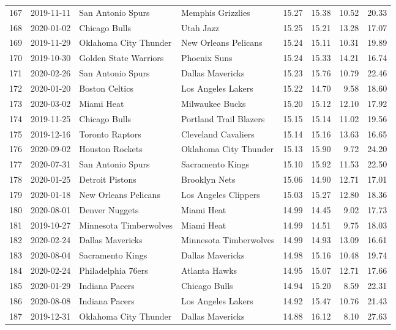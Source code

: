\documentclass[
  11pt,
]{article}
\theoremstyle{nonumberplain}
\begin{document}
\begin{longtable}{rl|llr|rrr}
167 & 2019-11-11 & San Antonio Spurs & Memphis Grizzlies & 15.27 & 15.38 & 10.52 & 20.33\\
168 & 2020-01-02 & Chicago Bulls & Utah Jazz & 15.25 & 15.21 & 13.28 & 17.07\\
169 & 2019-11-29 & Oklahoma City Thunder & New Orleans Pelicans & 15.24 & 15.11 & 10.31 & 19.89\\
170 & 2019-10-30 & Golden State Warriors & Phoenix Suns & 15.24 & 15.33 & 14.21 & 16.74\\
171 & 2020-02-26 & San Antonio Spurs & Dallas Mavericks & 15.23 & 15.76 & 10.79 & 22.46\\
172 & 2020-01-20 & Boston Celtics & Los Angeles Lakers & 15.22 & 14.70 & 9.58 & 18.60\\
173 & 2020-03-02 & Miami Heat & Milwaukee Bucks & 15.20 & 15.12 & 12.10 & 17.92\\
174 & 2019-11-25 & Chicago Bulls & Portland Trail Blazers & 15.15 & 15.14 & 11.02 & 19.56\\
175 & 2019-12-16 & Toronto Raptors & Cleveland Cavaliers & 15.14 & 15.16 & 13.63 & 16.65\\
176 & 2020-09-02 & Houston Rockets & Oklahoma City Thunder & 15.13 & 15.90 & 9.72 & 24.20\\
177 & 2020-07-31 & San Antonio Spurs & Sacramento Kings & 15.10 & 15.92 & 11.53 & 22.50\\
178 & 2020-01-25 & Detroit Pistons & Brooklyn Nets & 15.06 & 14.90 & 12.71 & 17.01\\
179 & 2020-01-18 & New Orleans Pelicans & Los Angeles Clippers & 15.03 & 15.27 & 12.80 & 18.36\\
180 & 2020-08-01 & Denver Nuggets & Miami Heat & 14.99 & 14.45 & 9.02 & 17.73\\
181 & 2019-10-27 & Minnesota Timberwolves & Miami Heat & 14.99 & 14.51 & 9.75 & 18.03\\
182 & 2020-02-24 & Dallas Mavericks & Minnesota Timberwolves & 14.99 & 14.93 & 13.09 & 16.61\\
183 & 2020-08-04 & Sacramento Kings & Dallas Mavericks & 14.98 & 15.16 & 10.48 & 19.74\\
184 & 2020-02-24 & Philadelphia 76ers & Atlanta Hawks & 14.95 & 15.07 & 12.71 & 17.66\\
185 & 2020-01-29 & Indiana Pacers & Chicago Bulls & 14.94 & 15.20 & 8.59 & 22.31\\
186 & 2020-08-08 & Indiana Pacers & Los Angeles Lakers & 14.92 & 15.47 & 10.76 & 21.43\\
187 & 2019-12-31 & Oklahoma City Thunder & Dallas Mavericks & 14.88 & 16.12 & 8.10 & 27.63\\

\end{longtable}
\end{document}
